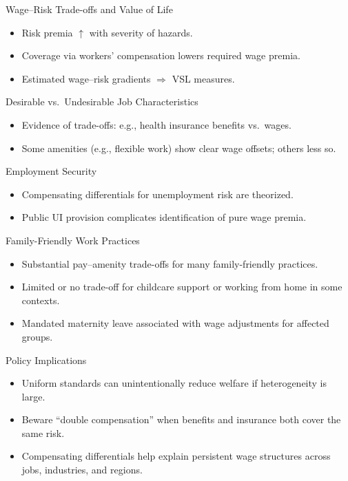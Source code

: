 \documentclass[aspectratio=169]{beamer}
\begin{document}
\begin{frame}{Wage–Risk Trade-offs and Value of Life}
\transfade
\begin{itemize}[<+->]
  \item Risk premia \(\uparrow\) with severity of hazards.
  \item Coverage via workers’ compensation lowers required wage premia.
  \item Estimated wage–risk gradients \(\Rightarrow\) VSL measures.
\end{itemize}
\end{frame}

\begin{frame}{Desirable vs.\ Undesirable Job Characteristics}
\transfade
\begin{itemize}[<+->]
  \item Evidence of trade-offs: e.g., health insurance benefits vs.\ wages.
  \item Some amenities (e.g., flexible work) show clear wage offsets; others less so.
\end{itemize}
\end{frame}

\begin{frame}{Employment Security}
\transfade
\begin{itemize}[<+->]
  \item Compensating differentials for unemployment risk are theorized.
  \item Public UI provision complicates identification of pure wage premia.
\end{itemize}
\end{frame}

\begin{frame}{Family-Friendly Work Practices}
\transfade
\begin{itemize}[<+->]
  \item Substantial pay–amenity trade-offs for many family-friendly practices.
  \item Limited or no trade-off for childcare support or working from home in some contexts.
  \item Mandated maternity leave associated with wage adjustments for affected groups.
\end{itemize}
\end{frame}

\begin{frame}{Policy Implications}
\transfade
\begin{itemize}[<+->]
  \item Uniform standards can unintentionally reduce welfare if heterogeneity is large.
  \item Beware “double compensation” when benefits and insurance both cover the same risk.
  \item Compensating differentials help explain persistent wage structures across jobs, industries, and regions.
\end{itemize}
\end{frame}
\end{document}
